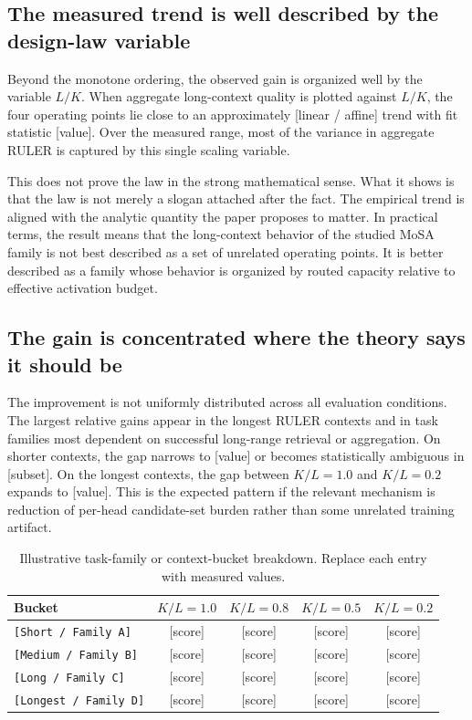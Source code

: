 \documentclass[11pt]{article}
\begin{document}
\subsection{The measured trend is well described by the design-law variable}

Beyond the monotone ordering, the observed gain is organized well by the variable $L/K$. When aggregate long-context quality is plotted against $L/K$, the four operating points lie close to an approximately [linear / affine] trend with fit statistic [value]. Over the measured range, most of the variance in aggregate RULER is captured by this single scaling variable.

This does not prove the law in the strong mathematical sense. What it shows is that the law is not merely a slogan attached after the fact. The empirical trend is aligned with the analytic quantity the paper proposes to matter. In practical terms, the result means that the long-context behavior of the studied MoSA family is not best described as a set of unrelated operating points. It is better described as a family whose behavior is organized by routed capacity relative to effective activation budget.

\subsection{The gain is concentrated where the theory says it should be}

The improvement is not uniformly distributed across all evaluation conditions. The largest relative gains appear in the longest RULER contexts and in task families most dependent on successful long-range retrieval or aggregation. On shorter contexts, the gap narrows to [value] or becomes statistically ambiguous in [subset]. On the longest contexts, the gap between $K/L=1.0$ and $K/L=0.2$ expands to [value]. This is the expected pattern if the relevant mechanism is reduction of per-head candidate-set burden rather than some unrelated training artifact.

\begin{table}[H]
\centering
\caption{Illustrative task-family or context-bucket breakdown. Replace each entry with measured values.}
\label{tab:breakdown}
\begin{tabular}{lcccc}
\toprule
Bucket & $K/L=1.0$ & $K/L=0.8$ & $K/L=0.5$ & $K/L=0.2$ \\
\midrule
\texttt{[Short / Family A]} & [score] & [score] & [score] & [score] \\
\texttt{[Medium / Family B]} & [score] & [score] & [score] & [score] \\
\texttt{[Long / Family C]} & [score] & [score] & [score] & [score] \\
\texttt{[Longest / Family D]} & [score] & [score] & [score] & [score] \\
\bottomrule
\end{tabular}
\end{table}
\end{document}
